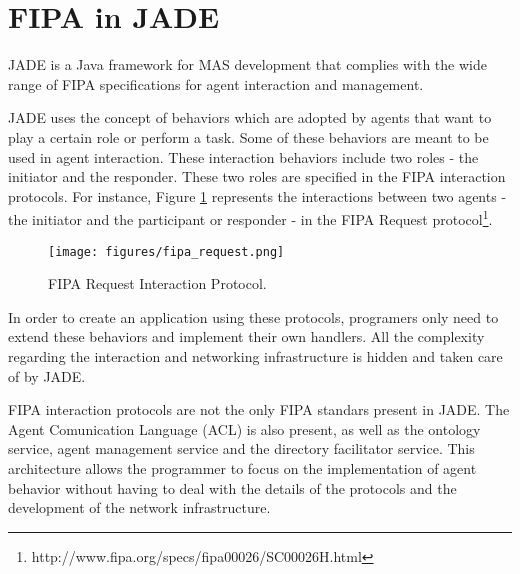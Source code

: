\section{FIPA in JADE} %
\label{sec:jade}

JADE is a Java framework for MAS development that complies with the wide range of FIPA specifications for agent interaction and management.

JADE uses the concept of behaviors which are adopted by agents that want to play a certain role or perform a task. Some of these behaviors are meant to be used in agent interaction. These interaction behaviors include two roles - the initiator and the responder. These two roles are specified in the FIPA interaction protocols. For instance, Figure \ref{fig:fipa_request} represents the interactions between two agents - the initiator and the participant or responder - in the FIPA Request protocol\footnote{http://www.fipa.org/specs/fipa00026/SC00026H.html}.

\begin{figure}[h]
	\centering
	\texttt{[image: figures/fipa\_request.png]}
	\caption{
		FIPA Request Interaction Protocol.
	}
	\label{fig:fipa_request}
\end{figure}

In order to create an application using these protocols, programers only need to extend these behaviors and implement their own handlers. All the complexity regarding the interaction and networking infrastructure is hidden and taken care of by JADE.

FIPA interaction protocols are not the only FIPA standars present in JADE. The Agent Comunication Language (ACL) is also present, as well as the ontology service, agent management service and the directory facilitator service.
This architecture allows the programmer to focus on the implementation of agent behavior without having to deal with the details of the protocols and the development of the network infrastructure. \cite{bellifemine2003jade}